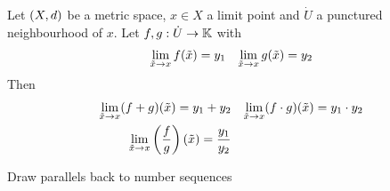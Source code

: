\documentclass[../../script.tex] {subfiles}
\begin{document}
\begin{cor}
    Let $(X, d)$ be a metric space, $x \in X$ a limit point and $\dot{U}$ a punctured neighbourhood of $x$. Let $f, g: \dot{U} \rightarrow \mathbb{K}$ with 
    \begin{align*}
        \lim_{\tilde{x} \rightarrow x} f(\tilde{x}) = y_1 && \lim_{\tilde{x} \rightarrow x} g(\tilde{x}) = y_2
    \end{align*}
    Then 
    \begin{align*}
        \lim_{\tilde{x} \rightarrow x} (f + g)(\tilde{x}) = y_1 + y_2 && \lim_{\tilde{x} \rightarrow x} (f \cdot g)(\tilde{x}) = y_1 \cdot y_2 \\
        \lim_{\tilde{x} \rightarrow x} \left(\frac{f}{g}\right)(\tilde{x}) = \frac{y_1}{y_2}
    \end{align*}
\end{cor}
\begin{hproof}
    Draw parallels back to number sequences
\end{hproof}
\end{document}
